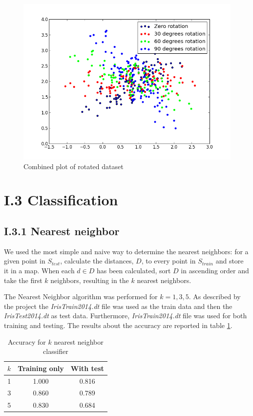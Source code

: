 \documentclass[12pt]{article}
\begin{document}
  \begin{figure}[H]
    \centering
        \includegraphics[width=1.0\textwidth]{figures/figure_I_2_4_rot}
    \caption{Combined plot of rotated dataset }
    \label{fig:distribution_rotated}
  \end{figure}

\section*{I.3 Classification}

\subsection*{I.3.1 Nearest neighbor}

   We used the most simple and naive way to determine the nearest neighbors: for a given point in $S_{test}$, calculate the distances, $D$, to every point in $S_{train}$ and store it in a map. When each $d \in D$ has been calculated, sort $D$ in ascending order and take the first $k$ neighbors, resulting in the $k$ nearest neighbors. 

   The Nearest Neighbor algorithm was performed for $k = 1,3,5$. As described by the project the \textit{IrisTrain2014.dt} file was used as the train data and then the \textit{IrisTest2014.dt} as test data. Furthermore, \textit{IrisTrain2014.dt} file was used for both training and testing. The results about the accuracy are reported in table \ref{table:accuracy_nearest_neigbor}.

  \begin{table}[h]
    \centering
    \begin{tabular}{| c | c | c |}
      \hline
        $k$ & Training only & With test \\
      \hline
        1 & 1.000 & 0.816 \\
        3 & 0.860 & 0.789 \\
        5 & 0.830 & 0.684 \\
      \hline
    \end{tabular}
    \caption{Accuracy for $k$ nearest neighbor classifier}
    \label{table:accuracy_nearest_neigbor}
  \end{table}
\end{document}
